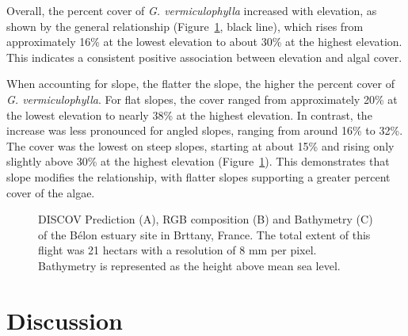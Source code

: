 \documentclass[
  letterpaper,
  DIV=11,
  numbers=noendperiod]{scrartcl}
\begin{document}
Overall, the percent cover of \emph{G. vermiculophylla} increased with
elevation, as shown by the general relationship
(Figure~\ref{fig-Gam_Slope}, black line), which rises from approximately
16\% at the lowest elevation to about 30\% at the highest elevation.
This indicates a consistent positive association between elevation and
algal cover.

When accounting for slope, the flatter the slope, the higher the percent
cover of \emph{G. vermiculophylla}. For flat slopes, the cover ranged
from approximately 20\% at the lowest elevation to nearly 38\% at the
highest elevation. In contrast, the increase was less pronounced for
angled slopes, ranging from around 16\% to 32\%. The cover was the
lowest on steep slopes, starting at about 15\% and rising only slightly
above 30\% at the highest elevation (Figure~\ref{fig-Gam_Slope}). This
demonstrates that slope modifies the relationship, with flatter slopes
supporting a greater percent cover of the algae.

\label{cell-fig-Gam_Slope}
\begin{figure}[H]


\caption{\label{fig-Gam_Slope}DISCOV Prediction (A), RGB composition (B)
and Bathymetry (C) of the Bélon estuary site in Brttany, France. The
total extent of this flight was 21 hectars with a resolution of 8 mm per
pixel. Bathymetry is represented as the height above mean sea level.}

\end{figure}%

\section{Discussion}\label{discussion}
\end{document}
